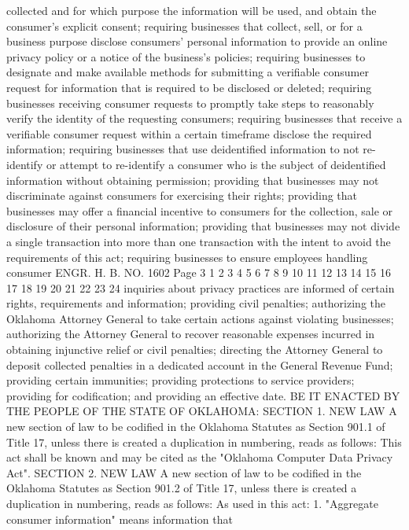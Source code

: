collected and for which purpose the information will
be used, and obtain the consumer's explicit consent;
requiring businesses that collect, sell, or for a
business purpose disclose consumers' personal
information to provide an online privacy policy or a
notice of the business's policies; requiring
businesses to designate and make available methods
for submitting a verifiable consumer request for
information that is required to be disclosed or
deleted; requiring businesses receiving consumer
requests to promptly take steps to reasonably verify
the identity of the requesting consumers; requiring
businesses that receive a verifiable consumer request
within a certain timeframe disclose the required
information; requiring businesses that use deidentified information to not re-identify or attempt
to re-identify a consumer who is the subject of deidentified information without obtaining permission;
providing that businesses may not discriminate
against consumers for exercising their rights;
providing that businesses may offer a financial
incentive to consumers for the collection, sale or
disclosure of their personal information; providing
that businesses may not divide a single transaction
into more than one transaction with the intent to
avoid the requirements of this act; requiring
businesses to ensure employees handling consumer 
ENGR. H. B. NO. 1602 Page 3
1
2
3
4
5
6
7
8
9
10
11
12
13
14
15
16
17
18
19
20
21
22
23
24
inquiries about privacy practices are informed of
certain rights, requirements and information;
providing civil penalties; authorizing the Oklahoma
Attorney General to take certain actions against
violating businesses; authorizing the Attorney
General to recover reasonable expenses incurred in
obtaining injunctive relief or civil penalties;
directing the Attorney General to deposit collected
penalties in a dedicated account in the General
Revenue Fund; providing certain immunities; providing
protections to service providers; providing for
codification; and providing an effective date.
BE IT ENACTED BY THE PEOPLE OF THE STATE OF OKLAHOMA:
SECTION 1. NEW LAW A new section of law to be codified
in the Oklahoma Statutes as Section 901.1 of Title 17, unless there
is created a duplication in numbering, reads as follows:
This act shall be known and may be cited as the "Oklahoma
Computer Data Privacy Act".
SECTION 2. NEW LAW A new section of law to be codified
in the Oklahoma Statutes as Section 901.2 of Title 17, unless there
is created a duplication in numbering, reads as follows:
As used in this act:
1. "Aggregate consumer information" means information that
